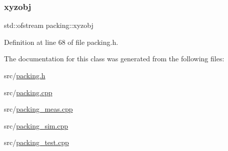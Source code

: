 \subsubsection{\texorpdfstring{xyzobj}{xyzobj}}
{\footnotesize\ttfamily std\+::ofstream packing\+::xyzobj\hspace{0.3cm}{\ttfamily [protected]}}



Definition at line 68 of file packing.\+h.



The documentation for this class was generated from the following files\+:\begin{DoxyCompactItemize}
\item 
src/\mbox{\hyperlink{packing_8h}{packing.\+h}}\item 
src/\mbox{\hyperlink{packing_8cpp}{packing.\+cpp}}\item 
src/\mbox{\hyperlink{packing__meas_8cpp}{packing\+\_\+meas.\+cpp}}\item 
src/\mbox{\hyperlink{packing__sim_8cpp}{packing\+\_\+sim.\+cpp}}\item 
src/\mbox{\hyperlink{packing__test_8cpp}{packing\+\_\+test.\+cpp}}\end{DoxyCompactItemize}
